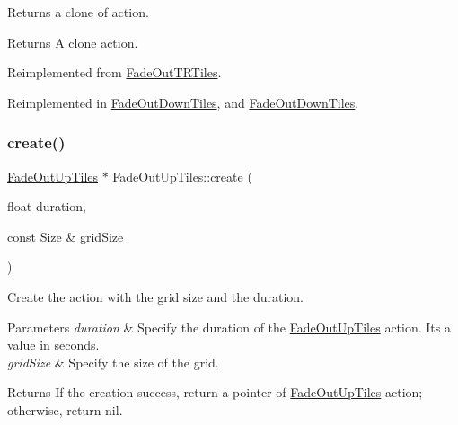 Returns a clone of action.

\begin{DoxyReturn}{Returns}
A clone action. 
\end{DoxyReturn}


Reimplemented from \hyperlink{classFadeOutTRTiles_af7a6bf6cfa4ef6cccae911b026e49b48}{Fade\+Out\+T\+R\+Tiles}.



Reimplemented in \hyperlink{classFadeOutDownTiles_aa7b17d06be4e0d54a401464fd3edcee1}{Fade\+Out\+Down\+Tiles}, and \hyperlink{classFadeOutDownTiles_a4a35c11502bbb834d6d4137cb03d2843}{Fade\+Out\+Down\+Tiles}.

\mbox{\label{classFadeOutUpTiles_a77864d03a89dc07e615029f723f0356c}} 
\subsubsection{\texorpdfstring{create()}{create()}\hspace{0.1cm}{\footnotesize\ttfamily [1/2]}}
{\footnotesize\ttfamily \hyperlink{classFadeOutUpTiles}{Fade\+Out\+Up\+Tiles} $\ast$ Fade\+Out\+Up\+Tiles\+::create (\begin{DoxyParamCaption}\item[{float}]{duration,  }\item[{const \hyperlink{classSize}{Size} \&}]{grid\+Size }\end{DoxyParamCaption})\hspace{0.3cm}{\ttfamily [static]}}



Create the action with the grid size and the duration. 


\begin{DoxyParams}{Parameters}
{\em duration} & Specify the duration of the \hyperlink{classFadeOutUpTiles}{Fade\+Out\+Up\+Tiles} action. It\textquotesingle{}s a value in seconds. \\
\hline
{\em grid\+Size} & Specify the size of the grid. \\
\hline
\end{DoxyParams}
\begin{DoxyReturn}{Returns}
If the creation success, return a pointer of \hyperlink{classFadeOutUpTiles}{Fade\+Out\+Up\+Tiles} action; otherwise, return nil. 
\end{DoxyReturn}
\mbox{\label{classFadeOutUpTiles_a7afb384f50c3e2ca338c3c4b7905b4da}} 
